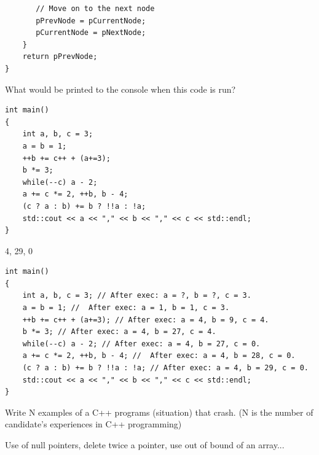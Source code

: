 \documentclass[answers]{exam}
\newcommand*{\ANCOAMATH}{}%
\begin{document}
\begin{questions}
\begin{solution}[.2in]
\begin{lstlisting}
       // Move on to the next node
       pPrevNode = pCurrentNode;
       pCurrentNode = pNextNode;
    }
    return pPrevNode;
}
\end{lstlisting}
\end{solution}

\question What would be printed to the console when this code is run?
\begin{lstlisting}
int main()
{
    int a, b, c = 3;
    a = b = 1;
    ++b += c++ + (a+=3);
    b *= 3;
    while(--c) a - 2;
    a += c *= 2, ++b, b - 4;
    (c ? a : b) += b ? !!a : !a;
    std::cout << a << "," << b << "," << c << std::endl;
}
\end{lstlisting}
\begin{solution}[.2in]
4, 29, 0
\begin{lstlisting}
int main()
{
    int a, b, c = 3; // After exec: a = ?, b = ?, c = 3.
    a = b = 1; //  After exec: a = 1, b = 1, c = 3.
    ++b += c++ + (a+=3); // After exec: a = 4, b = 9, c = 4.
    b *= 3; // After exec: a = 4, b = 27, c = 4.
    while(--c) a - 2; // After exec: a = 4, b = 27, c = 0.
    a += c *= 2, ++b, b - 4; //  After exec: a = 4, b = 28, c = 0.
    (c ? a : b) += b ? !!a : !a; // After exec: a = 4, b = 29, c = 0.
    std::cout << a << "," << b << "," << c << std::endl;
}
\end{lstlisting}
\end{solution}

\question Write N examples of a C++ programs (situation) that crash. (N is the number of candidate's experiences in C++ programming)
\begin{solution}[.2in]
	Use of null pointers, delete twice a pointer, use out of bound of an array...
\end{solution}

\end{questions}
\fi
\ifdefined\ANCOAMATH
\newpage
\end{document}
